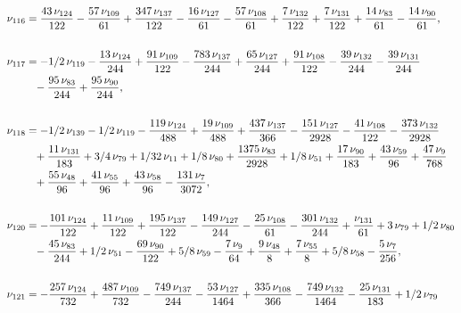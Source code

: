 \documentclass[a4paper,12pt, DIV=14, BCOR=5mm, twoside, headsepline, numbers=noenddot]{scrbook}
\begin{document}
\begin{align}\label{AreaSol11}
\begin{aligned}
\nu_{{116}}&={\frac {43\,\nu
_{{124}}}{122}}-{\frac {57\,\nu_{{109}}}{61}}+{\frac {347\,\nu_{{137}}
}{122}}-{\frac {16\,\nu_{{127}}}{61}}-{\frac {57\,\nu_{{108}}}{61}}+{
\frac {7\,\nu_{{132}}}{122}}+{\frac {7\,\nu_{{131}}}{122}}+{\frac {14
\,\nu_{{83}}}{61}}-{\frac {14\,\nu_{{90}}}{61}}, \\
\\
\nu_{{117}}&=-1/2\,\nu_
{{119}}-{\frac {13\,\nu_{{124}}}{244}}+{\frac {91\,\nu_{{109}}}{122}}-
{\frac {783\,\nu_{{137}}}{244}}+{\frac {65\,\nu_{{127}}}{244}}+{\frac 
{91\,\nu_{{108}}}{122}}-{\frac {39\,\nu_{{132}}}{244}}-{\frac {39\,\nu
_{{131}}}{244}}\\
 &\hphantom{=}-{\frac {95\,\nu_{{83}}}{244}}+{\frac {95\,\nu_{{90}}}{
244}}, \\
\\
\nu_{{118}}&=-1/2\,\nu_{{139}}-1/2\,\nu_{{119}}-{\frac {119\,\nu_
{{124}}}{488}}+{\frac {19\,\nu_{{109}}}{488}}+{\frac {437\,\nu_{{137}}
}{366}}-{\frac {151\,\nu_{{127}}}{2928}}-{\frac {41\,\nu_{{108}}}{122}
}-{\frac {373\,\nu_{{132}}}{2928}}\\
 &\hphantom{=}+{\frac {11\,\nu_{{131}}}{183}}+3/4
\,\nu_{{79}}+1/32\,\nu_{{11}}+1/8\,\nu_{{80}}+{\frac {1375\,\nu_{{83}}
}{2928}}+1/8\,\nu_{{51}}+{\frac {17\,\nu_{{90}}}{183}}+{\frac {43\,\nu
_{{59}}}{96}}+{\frac {47\,\nu_{{9}}}{768}}\\
 &\hphantom{=}+{\frac {55\,\nu_{{48}}}{96}
}+{\frac {41\,\nu_{{55}}}{96}}+{\frac {43\,\nu_{{58}}}{96}}-{\frac {
131\,\nu_{{7}}}{3072}}, \\
\\
\nu_{{120}}&=-{\frac {101\,\nu_{{124}}}{122}}+{
\frac {11\,\nu_{{109}}}{122}}+{\frac {195\,\nu_{{137}}}{122}}-{\frac {
149\,\nu_{{127}}}{244}}-{\frac {25\,\nu_{{108}}}{61}}-{\frac {301\,\nu
_{{132}}}{244}}+{\frac {\nu_{{131}}}{61}}+3\,\nu_{{79}}+1/2\,\nu_{{80}
}\\
 &\hphantom{=}-{\frac {45\,\nu_{{83}}}{244}}+1/2\,\nu_{{51}}-{\frac {69\,\nu_{{90}}
}{122}}+5/8\,\nu_{{59}}-{\frac {7\,\nu_{{9}}}{64}}+{\frac {9\,\nu_{{48
}}}{8}}+{\frac {7\,\nu_{{55}}}{8}}+5/8\,\nu_{{58}}-{\frac {5\,\nu_{{7}
}}{256}}, \\
\\
\nu_{{121}}&=-{\frac {257\,\nu_{{124}}}{732}}+{\frac {487\,\nu
_{{109}}}{732}}-{\frac {749\,\nu_{{137}}}{244}}-{\frac {53\,\nu_{{127}
}}{1464}}+{\frac {335\,\nu_{{108}}}{366}}-{\frac {749\,\nu_{{132}}}{
1464}}-{\frac {25\,\nu_{{131}}}{183}}+1/2\,\nu_{{79}}\\

\end{aligned}
\end{align}
\end{document}

